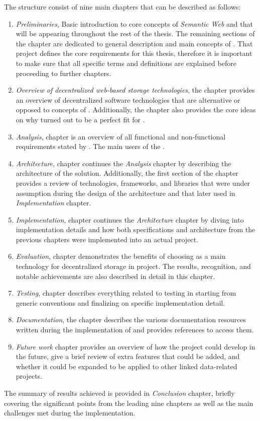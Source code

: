 The structure consist of nine main chapters that can be described as follows:
\begin{enumerate}
    \item \textit{Preliminaries}, Basic introduction to core concepts of \textit{Semantic Web} and \solid{} that will be appearing throughout the rest of the thesis. The remaining sections of the chapter are dedicated to general description and main concepts of \lpa{}. That project defines the core requirements for this thesis, therefore it is important to make sure that all \lpa{} specific terms and definitions are explained before proceeding to further chapters.
    
    \item \textit{Overview of decentralized web-based storage technologies}, the chapter provides an overview of decentralized software technologies that are alternative or opposed to concepts of \solid{}. Additionally, the chapter also provides the core ideas on why \solid{} turned out to be a perfect fit for \lpa{}.

    \item \textit{Analysis}, chapter is an overview of all functional and non-functional requirements stated by \lpa{}. The main users of the \lpas{}.

    \item \textit{Architecture}, chapter continues the \textit{Analysis} chapter by describing the architecture of the solution. Additionally, the first section of the chapter provides a review of technologies, frameworks, and libraries that were under assumption during the design of the architecture and that later used in \textit{Implementation} chapter.  

    \item \textit{Implementation}, chapter continues the \textit{Architecture} chapter by diving into implementation details and how both specifications and architecture from the previous chapters were implemented into an actual project. 
    
    \item \textit{Evaluation}, chapter demonstrates the benefits of choosing \solid{} as a main technology for decentralized storage in \lpa{} project. The results, recognition, and notable achievements are also described in detail in this chapter.
    
    \item \textit{Testing}, chapter describes everything related to testing in \lpas{} starting from generic conventions and finalizing on specific implementation detail.
    
    \item \textit{Documentation}, the chapter describes the various documentation resources written during the implementation of \lpa{} and provides references to access them.
     
     \item \textit{Future work} chapter provides an overview of how the project could develop in the future, give a brief review of extra features that could be added, and whether it could be expanded to be applied to other linked data-related projects.
\end{enumerate}

The summary of results achieved is provided in \textit{Conclusion} chapter, briefly covering the significant points from the leading nine chapters as well as the main challenges met during the implementation.
